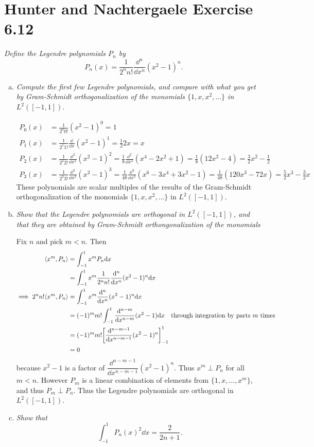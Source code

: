 \documentclass[12pt]{article}
\theoremstyle{plain}
\begin{document}
\section*{Hunter and Nachtergaele Exercise 6.12}
\emph{Define the \emph{Legendre polynomials} $P_n$ by $$P_n(x) = \frac{1}{2^n n!}\frac{\dd^n}{\dd x^n}(x^2 - 1)^n.$$}
\begin{enumerate}[(a)]
    \item
        \emph{Compute the first few Legendre polynomials, and compare with what you get by Gram-Schmidt orthogonalization of the monomials $\{1, x, x^2, \dots\}$ in $L^2([-1,1])$.}

        \begin{align*}
            P_0(x) &= \frac{1}{2^0 0!} (x^2 - 1)^0 = 1 \\
            P_1(x) &= \frac{1}{2^1 1!} \frac{\dd}{\dd x}(x^2 - 1)^1 = \frac{1}{2} 2x = x \\
            P_2(x) &= \frac{1}{2^2 2!} \frac{\dd^2}{\dd x^2}(x^2 - 1)^2 = \frac{1}{8}\frac{\dd^2}{\dd x^2}(x^4 - 2x^2 + 1) = \frac{1}{8}(12x^2 - 4) = \frac{3}{2}x^2 - \frac{1}{2} \\
            P_3(x) &= \frac{1}{2^3 3!}\frac{\dd^3}{\dd x^3}(x^2 - 1)^3 = \frac{1}{48}\frac{\dd^3}{\dd x^3}(x^6 - 3x^4 + 3x^2 - 1) = \frac{1}{48}(120x^3 - 72x) = \frac{5}{2}x^3 - \frac{3}{2}x
        \end{align*}
        These polynomials are scalar multiples of the results of the Gram-Schmidt orthogonalization of the monomials $\{1, x, x^2, \dots\}$ in $L^2([-1,1])$.
    \item
        \emph{Show that the Legendre polynomials are orthogonal in $L^2([-1, 1])$, and that they are obtained by Gram-Schmidt orthongonalization of the monomials}

        Fix $n$ and pick $m < n$.  Then
        \begin{align*}
            \langle x^m, P_n \rangle &= \int_{-1}^1 x^m P_n \dd x \\
            &= \int_{-1}^1 x^m \frac{1}{2^n n!}\frac{\dd^n}{\dd x^n}(x^2 - 1)^n \dd x \\
            \implies 2^n n!\langle x^m, P_n \rangle &= \int_{-1}^{1} x^m \frac{\dd^n}{\dd x^n}(x^2 - 1)^n \dd x \\
            &= (-1)^m m! \int_{-1}^1 \frac{\dd^{n-m}}{\dd x^{n-m}}(x^2 - 1)\dd x\ \ \ \text{through integration by parts $m$ times} \\
            &= (-1)^m m! \qty[\frac{\dd^{n-m-1}}{\dd x^{n-m-1}}(x^2 - 1)^n]_{-1}^1 \\
            &= 0
        \end{align*}
        because $x^2 - 1$ is a factor of $\dfrac{\dd^{n-m-1}}{\dd x^{n-m-1}}(x^2 - 1)^n$.  Thus $x^m \perp P_n$ for all $m < n$.  However $P_m$ is a linear combination of elements from $\{1, x, \dots, x^m\}$, and thus $P_m \perp P_n$.  Thus the Legendre polynomials are orthogonal in $L^2([-1,1])$.
    \item
        \emph{Show that $$\int_{-1}^1 P_n(x)^2 \dd x = \frac{2}{2n + 1}.$$}


\end{enumerate}
\end{document}
